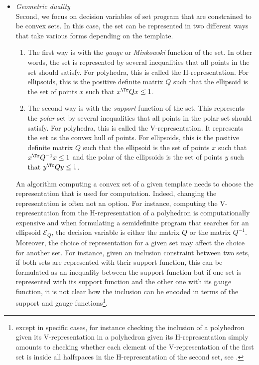 \begin{itemize}
\item \textit{Geometric duality} \\

Second, we focus on decision variables of set program that are constrained to be convex sets.
In this case, the set can be represented in two different ways that take various forms depending on the template.
\begin{enumerate}
  \item The first way is with the \emph{gauge} or \emph{Minkowski} function of the set.
    In other words, the set is represented by several inequalities that all points in the set should satisfy.
    For polyhedra, this is called the H-representation.
    For ellipsoids, this is the positive definite matrix $Q$ such that the ellipsoid is the set of points $x$ such that $x^\Tr Q x \le 1$.
  \item The second way is with the \emph{support} function of the set.
    This represents the \emph{polar} set by several inequalities that all points in the polar set should satisfy.
    For polyhedra, this is called the V-representation.
    It represents the set as the convex hull of points.
    For ellipsoids, this is the positive definite matrix $Q$ such that the ellipsoid is the set of points $x$ such that $x^\Tr Q^{-1} x \le 1$
    and the polar of the ellipsoids is the set of points $y$ such that $y^\Tr Q y \le 1$.
\end{enumerate}
An algorithm computing a convex set of a given template needs to choose the representation that is used for computation.
Indeed, changing the representation is often not an option.
For instance, computing the V-representation from the H-representation of a polyhedron is computationally expensive
and when formulating a semidefinite program that searches for an ellipsoid $\mathcal{E}_Q$, the decision variable is either the matrix $Q$ or the matrix $Q^{-1}$.
Moreover, the choice of representation for a given set may affect the choice for another set.
For instance, given an inclusion constraint between two sets, if both sets are represented with their support function, this can be formulated
as an inequality between the support function but if one set is represented with its support function and the other one with its gauge function,
it is not clear how the inclusion can be encoded in terms of the support and gauge functions\footnote{except in specific cases, for instance checking the inclusion of a polyhedron given its V-representation in a polyhedron given its H-representation simply amounts to checking whether each element of the V-representation of the first set is inside all halfspaces in the H-representation of the second set, see .}.


\end{itemize}

